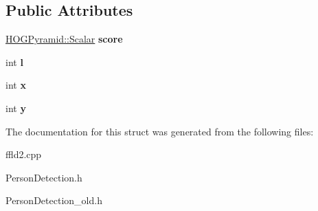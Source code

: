 \subsection*{Public Attributes}
\begin{DoxyCompactItemize}
\item 
\hypertarget{struct_detection_a6bb0acb0597ec67b7049c2560c6c7783}{\hyperlink{class_f_f_l_d_1_1_h_o_g_pyramid_af17c08ed86557e0a0aecb4814daf87c3}{H\-O\-G\-Pyramid\-::\-Scalar} {\bfseries score}}\label{struct_detection_a6bb0acb0597ec67b7049c2560c6c7783}

\item 
\hypertarget{struct_detection_a08b01da4f3061254d1647bf737b172ed}{int {\bfseries l}}\label{struct_detection_a08b01da4f3061254d1647bf737b172ed}

\item 
\hypertarget{struct_detection_a7b71921325261514cd6dd42c8e90ba70}{int {\bfseries x}}\label{struct_detection_a7b71921325261514cd6dd42c8e90ba70}

\item 
\hypertarget{struct_detection_afa5d065ea13ce74dfd52c6a569313270}{int {\bfseries y}}\label{struct_detection_afa5d065ea13ce74dfd52c6a569313270}

\end{DoxyCompactItemize}


The documentation for this struct was generated from the following files\-:\begin{DoxyCompactItemize}
\item 
ffld2.\-cpp\item 
Person\-Detection.\-h\item 
Person\-Detection\-\_\-old.\-h\end{DoxyCompactItemize}
